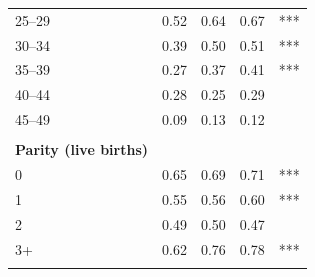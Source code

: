 \begin{tabular}{lccc}
\hspace*{2em}25--29&0.52&0.64&0.67&***\\
\hspace*{2em}30--34&0.39&0.50&0.51&***\\
\hspace*{2em}35--39&0.27&0.37&0.41&***\\
\hspace*{2em}40--44&0.28&0.25&0.29&\\
\hspace*{2em}45--49&0.09&0.13&0.12&\\
&&&&\\
\textbf{Parity (live births)}&&&&\\
\hspace*{2em}0&0.65&0.69&0.71&***\\
\hspace*{2em}1&0.55&0.56&0.60&***\\
\hspace*{2em}2&0.49&0.50&0.47&\\
\hspace*{2em}3+&0.62&0.76&0.78&***\\
&&&&\\
\bottomrule
\end{tabular}
